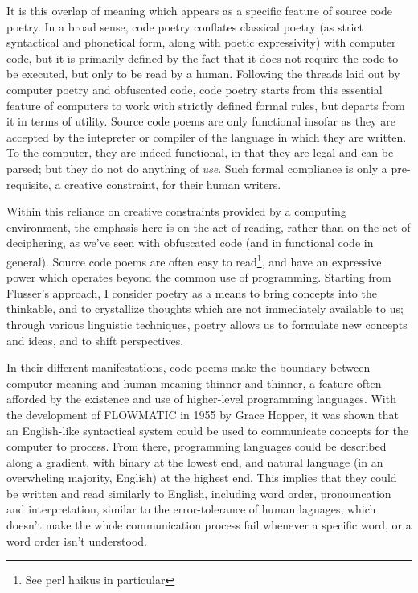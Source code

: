 \documentclass{article}
\begin{document}
It is this overlap of meaning which appears as a specific feature of source code poetry. In a broad sense, code poetry conflates classical poetry (as strict syntactical and phonetical form, along with poetic expressivity) with computer code, but it is primarily defined by the fact that it does not require the code to be executed, but only to be read by a human. Following the threads laid out by computer poetry and obfuscated code, code poetry starts from this essential feature of computers to work with strictly defined formal rules, but departs from it in terms of utility. Source code poems are only functional insofar as they are accepted by the intepreter or compiler of the language in which they are written. To the computer, they are indeed functional, in that they are legal and can be parsed; but they do not do anything of \emph{use}. Such formal compliance is only a pre-requisite, a creative constraint, for their human writers.

Within this reliance on creative constraints provided by a computing environment, the emphasis here is on the act of reading, rather than on the act of deciphering, as we've seen with obfuscated code (and in functional code in general). Source code poems are often easy to read\footnote{See perl haikus in particular}, and have an expressive power which operates beyond the common use of programming. Starting from Flusser's approach, I consider poetry as a means to bring concepts into the thinkable, and to crystallize thoughts which are not immediately available to us\cite{flusser_doubt_2014}; through various linguistic techniques, poetry allows us to formulate new concepts and ideas, and to shift perspectives.

In their different manifestations, code poems make the boundary between computer meaning and human meaning thinner and thinner, a feature often afforded by the existence and use of higher-level programming languages. With the development of FLOWMATIC in 1955 by Grace Hopper, it was shown that an English-like syntactical system could be used to communicate concepts for the computer to process. From there, programming languages could be described along a gradient, with binary at the lowest end, and natural language (in an overwheling majority, English) at the highest end. This implies that they could be written and read similarly to English, including word order, pronouncation and interpretation, similar to the error-tolerance of human laguages, which doesn't make the whole communication process fail whenever a specific word, or a word order isn't understood.
\end{document}
